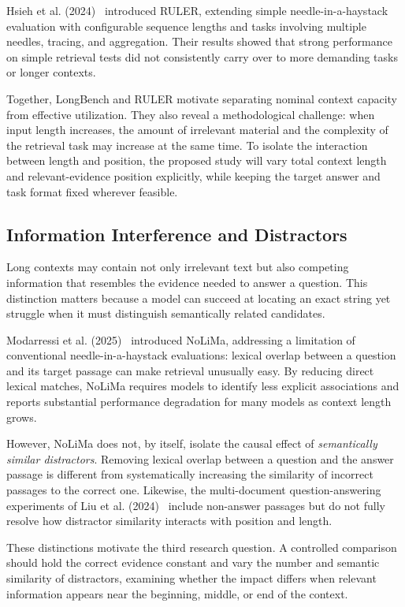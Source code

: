Hsieh et al. (2024)~\cite{hsieh2024ruler} introduced RULER, extending simple
needle-in-a-haystack evaluation with configurable sequence lengths and tasks
involving multiple needles, tracing, and aggregation. Their results showed that
strong performance on simple retrieval tests did not consistently carry over to
more demanding tasks or longer contexts.

Together, LongBench and RULER motivate separating nominal context capacity from
effective utilization. They also reveal a methodological challenge: when input
length increases, the amount of irrelevant material and the complexity of the
retrieval task may increase at the same time. To isolate the interaction
between length and position, the proposed study will vary total context length
and relevant-evidence position explicitly, while keeping the target answer and
task format fixed wherever feasible.

\subsection{Information Interference and Distractors}

Long contexts may contain not only irrelevant text but also competing
information that resembles the evidence needed to answer a question. This
distinction matters because a model can succeed at locating an exact string yet
struggle when it must distinguish semantically related candidates.

Modarressi et al. (2025)~\cite{modarressi2025nolima} introduced NoLiMa,
addressing a limitation of conventional needle-in-a-haystack evaluations:
lexical overlap between a question and its target passage can make retrieval
unusually easy. By reducing direct lexical matches, NoLiMa requires models to
identify less explicit associations and reports substantial performance
degradation for many models as context length grows.

However, NoLiMa does not, by itself, isolate the causal effect of
\emph{semantically similar distractors}. Removing lexical overlap between a
question and the answer passage is different from systematically increasing the
similarity of incorrect passages to the correct one. Likewise, the
multi-document question-answering experiments of Liu et al.
(2024)~\cite{liu2024lost} include non-answer passages but do not fully resolve
how distractor similarity interacts with position and length.

These distinctions motivate the third research question. A controlled
comparison should hold the correct evidence constant and vary the number and
semantic similarity of distractors, examining whether the impact differs when
relevant information appears near the beginning, middle, or end of the context.

